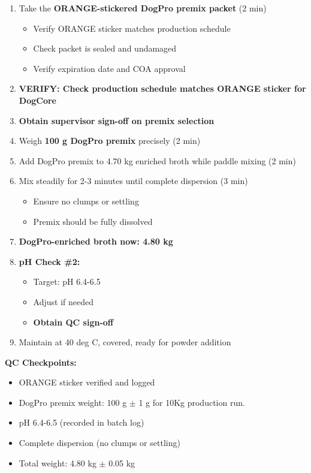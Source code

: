 \begin{enumerate}[leftmargin=1.5em]
\item Take the \textbf{ORANGE-stickered DogPro premix packet} (2 min)
  \begin{itemize}
  \item Verify ORANGE sticker matches production schedule
  \item Check packet is sealed and undamaged
  \item Verify expiration date and COA approval
  \end{itemize}
\item \textbf{VERIFY: Check production schedule matches ORANGE sticker for DogCore}
\item \textbf{Obtain supervisor sign-off on premix selection}
\item Weigh \textbf{100 g DogPro premix} precisely (2 min)
\item Add DogPro premix to 4.70 kg enriched broth while paddle mixing (2 min)
\item Mix steadily for 2-3 minutes until complete dispersion (3 min)
  \begin{itemize}
  \item Ensure no clumps or settling
  \item Premix should be fully dissolved
  \end{itemize}
\item \textbf{DogPro-enriched broth now: 4.80 kg}
\item \textbf{pH Check \#2:}
  \begin{itemize}
  \item Target: pH 6.4-6.5
  \item Adjust if needed
  \item \textbf{Obtain QC sign-off}
  \end{itemize}
\item Maintain at 40 deg C, covered, ready for powder addition
\end{enumerate}

\textbf{QC Checkpoints:}
\begin{itemize}
\item ORANGE sticker verified and logged
\item DogPro premix weight: 100 g $\pm$ 1 g for 10Kg production run. 
\item pH 6.4-6.5 (recorded in batch log)
\item Complete dispersion (no clumps or settling)
\item Total weight: 4.80 kg $\pm$ 0.05 kg
\end{itemize}

